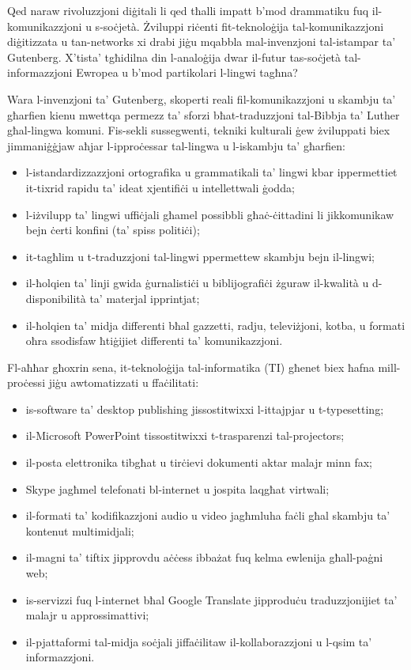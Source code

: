 \begin{multicols}{2}

Qed naraw rivoluzzjoni diġitali li qed tħalli impatt b’mod drammatiku fuq il-komunikazzjoni u s-soċjetà. Żviluppi riċenti fit-teknoloġija tal-komunikazzjoni diġitizzata u tan-networks xi drabi jiġu mqabbla mal-invenzjoni tal-istampar ta’ Gutenberg. X’tista’ tgħidilna din l-analoġija dwar il-futur tas-soċjetà tal-informazzjoni Ewropea u b’mod partikolari l-lingwi tagħna?

   
Wara l-invenzjoni ta’ Gutenberg, skoperti reali fil-komunikazzjoni u skambju ta’ għarfien kienu mwettqa permezz ta’ sforzi bħat-traduzzjoni tal-Bibbja ta’ Luther għal-lingwa komuni. Fis-sekli sussegwenti, tekniki kulturali ġew żviluppati biex jimmaniġġjaw aħjar l-ipproċessar tal-lingwa u l-iskambju ta’ għarfien:

\begin{itemize}
\item l-istandardizzazzjoni ortografika u grammatikali ta’ lingwi kbar ippermettiet it-tixrid rapidu ta’ ideat xjentifiċi u intellettwali ġodda;
\item l-iżvilupp ta’ lingwi uffiċjali għamel possibbli għaċ-ċittadini li jikkomunikaw bejn ċerti konfini (ta’ spiss politiċi);
\item it-tagħlim u t-traduzzjoni tal-lingwi ppermettew skambju bejn il-lingwi;
\item il-ħolqien ta’ linji gwida ġurnalistiċi u biblijografiċi żguraw il-kwalità u d-disponibilità ta’ materjal ipprintjat;
\item il-ħolqien ta’ midja differenti bħal gazzetti, radju, televiżjoni, kotba, u formati oħra ssodisfaw ħtiġijiet differenti ta’ komunikazzjoni.
\end{itemize}

Fl-aħħar għoxrin sena, it-teknoloġija tal-informatika (TI) għenet biex ħafna mill-proċessi jiġu awtomatizzati u ffaċilitati:

\begin{itemize}
\item is-software ta’ desktop publishing jissostitwixxi l-ittajpjar u t-typesetting;
\item il-Microsoft PowerPoint tissostitwixxi t-trasparenzi tal-projectors;
\item il-posta elettronika tibgħat u tirċievi dokumenti aktar malajr minn fax;
\item Skype jagħmel telefonati bl-internet u jospita laqgħat virtwali;
\item il-formati ta’ kodifikazzjoni audio u video jagħmluha faċli għal skambju ta’ kontenut multimidjali; 
\item il-magni ta’ tiftix jipprovdu aċċess ibbażat fuq kelma ewlenija għall-paġni web;
\item is-servizzi fuq l-internet bħal Google Translate jipproduċu traduzzjonijiet ta’ malajr u approssimattivi;
\item il-pjattaformi tal-midja soċjali jiffaċilitaw il-kollaborazzjoni u l-qsim ta’ informazzjoni. 
\end{itemize}


\end{multicols}

